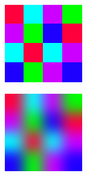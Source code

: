             \begin{figure}[H]
                \centering
                \begin{subfigure}{.333\textwidth}
                    \centering
                    \includegraphics[width=0.9\linewidth]{./images/Nearest_Neighbour_Normal.png}
                    \caption{}
                    \label{fig:example_nearest_neighbour_normal}
                \end{subfigure}%
                \begin{subfigure}{.333\textwidth}
                    \includegraphics[width=0.9\linewidth]{./images/Nearest_Neighbour_Blur_10px.png}

\end{subfigure}
\end{figure}
